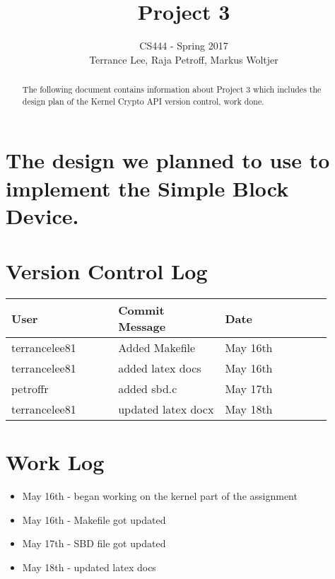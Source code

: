 \documentclass[draftclsnofoot,onecolumn,10pt,compsoc]{IEEEtran}
\begin{document}
\begin{titlepage}
	\title{Project 3}
	\author{CS444 - Spring 2017 \\ Terrance Lee, Raja Petroff, Markus Woltjer}
	\maketitle
	\begin{abstract}
		The following document contains information about Project 3 which includes the design plan of the Kernel Crypto API version control, work done.  
	\end{abstract}
	
	\thispagestyle{empty} %
	
\end{titlepage}

\tableofcontents

\newpage

\section{The design we planned to use to implement the Simple Block Device.}
\section{Version Control Log}
\begin{center}
	\begin{tabular}{| p{0.3\linewidth} | p{0.3\linewidth} | p{0.3\linewidth} |}
		\hline User & Commit Message & Date\\
		\hline terrancelee81 & Added Makefile & May 16th\\
		\hline terrancelee81 & added latex docs& May 16th\\
		\hline petroffr & added sbd.c & May 17th \\ 	
		\hline terrancelee81 & updated latex docx & May 18th\\
	\end{tabular}
\end{center}
\section{Work Log}
\begin{itemize}
	\item May 16th - began working on the kernel part of the assignment
	\item May 16th - Makefile got updated
	\item May 17th - SBD file got updated
	\item May 18th - updated latex docs
	
	
	
	
	
\end{itemize}
\end{document}
